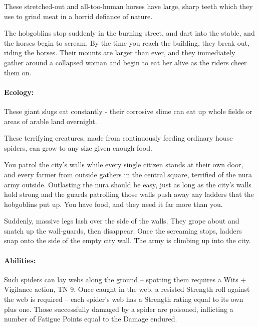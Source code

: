 \begin{multicols}{2}
These stretched-out and all-too-human horses have large, sharp teeth which they use to grind meat in a horrid defiance of nature.

\begin{boxtext}

	The hobgoblins stop suddenly in the burning street, and dart into the stable, and the horses begin to scream.
	By the time you reach the building, they break out, riding the horses.
	Their mounts are larger than ever, and they immediately gather around a collapsed woman and begin to eat her alive as the riders cheer them on.

\end{boxtext}

\label{nura_slug}

\paragraph{Ecology:} These giant slugs eat constantly - their corrosive slime can eat up whole fields or areas of arable land overnight.


\label{nura_spider}

These terrifying creatures, made from continuously feeding ordinary house spiders, can grow to any size given enough food.

\begin{boxtext}

	You patrol the city's walls while every single citizen stands at their own door, and every farmer from outside gathers in the central square, terrified of the nura army outside.
	Outlasting the nura should be easy, just as long as the city's walls hold strong and the guards patrolling those walls push away any ladders that the hobgoblins put up.
	You have food, and they need it far more than you.

	Suddenly, massive legs lash over the side of the walls.
	They grope about and snatch up the wall-guards, then disappear.
	Once the screaming stops, ladders snap onto the side of the empty city wall.
	The army is climbing up into the city.

\end{boxtext}

\nuraspider

\paragraph{Abilities:} Such spiders can lay webs along the ground -- spotting them requires a Wits + Vigilance action, TN 9.
Once caught in the web, a resisted Strength roll against the web is required -- each spider's web has a Strength rating equal to its own plus one.
Those successfully damaged by a spider are poisoned, inflicting a number of Fatigue Points equal to the Damage endured.


\end{multicols}
